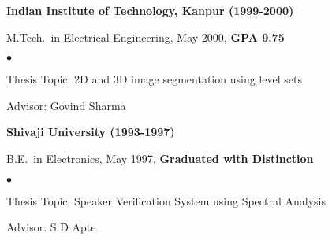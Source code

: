 \documentclass[overlapped,line,letterpaper]{res}
\newenvironment{list1}{
  \begin{list}{\ding{113}}{%
      \setlength{\itemsep}{0in}
      \setlength{\parsep}{0in} \setlength{\parskip}{0in}
      \setlength{\topsep}{0in} \setlength{\partopsep}{0in}
      \setlength{\leftmargin}{0.17in}}}{\end{list}}
\newenvironment{list2}{
  \begin{list}{$\bullet$}{%
      \setlength{\itemsep}{0in}
      \setlength{\parsep}{0in} \setlength{\parskip}{0in}
      \setlength{\topsep}{0in} \setlength{\partopsep}{0in}
      \setlength{\leftmargin}{0.2in}}}{\end{list}}
\begin{document}
\begin{resume}
{\bf Indian Institute of Technology, Kanpur (1999-2000)}\\
\vspace*{-.1in}
\begin{list1}
\item[] M.Tech.~in Electrical Engineering, May 2000, \textbf{GPA 9.75}
\begin{list2}
\item Thesis Topic: 2D and 3D image segmentation using level sets
\item Advisor: Govind Sharma
\end{list2}
\end{list1}

{\bf Shivaji University (1993-1997)}\\ 
\vspace*{-.1in}
\begin{list1}
\item[] B.E.~in Electronics, May 1997, \textbf{Graduated with Distinction}
\begin{list2}
\item Thesis Topic: Speaker Verification System using Spectral Analysis
\item Advisor: S D Apte
\end{list2}
\end{list1}


\end{resume}
\end{document}
